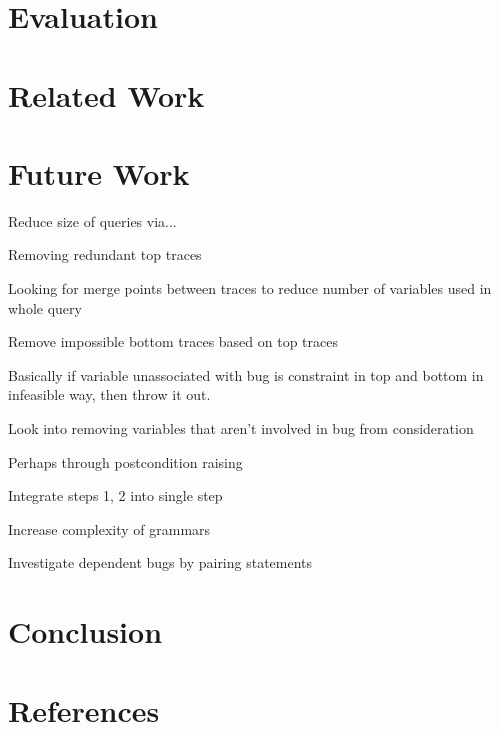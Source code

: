 \documentclass[]{article}
\begin{document}
\section{Evaluation}

\section{Related Work}

\section{Future Work}

Reduce size of queries via...

Removing redundant top traces

Looking for merge points between traces to reduce number of variables used in whole query

Remove impossible bottom traces based on top traces

Basically if variable unassociated with bug is constraint in top and bottom
in infeasible way, then throw it out.

Look into removing variables that aren't involved in bug from consideration

Perhaps through postcondition raising

Integrate steps 1, 2 into single step

Increase complexity of grammars

Investigate dependent bugs by pairing statements

\section{Conclusion}

\section{References}
\end{document}
